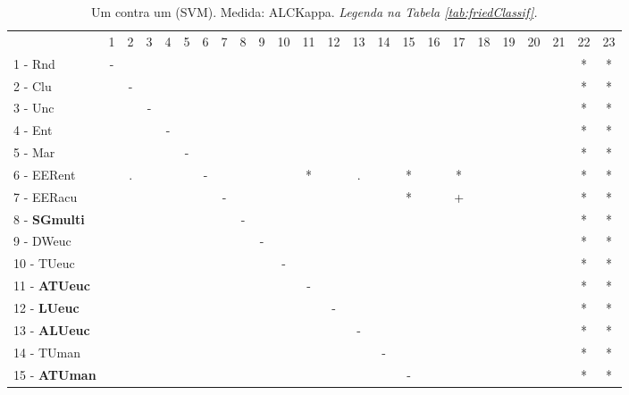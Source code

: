 \begin{table}[h]
\caption{Um contra um (SVM). Medida: ALCKappa. \textit{Legenda na Tabela \ref{tab:friedClassif}.}}
\begin{center}\begin{tabular}{lcc|cc|cc|cc|cc|cc|cc|cc|cc|cc|cc|c}
 			& 1 & 2 & 3 & 4 & 5 & 6 & 7 & 8 & 9 & 10 & 11 & 12 & 13 & 14 & 15 & 16 & 17 & 18 & 19 & 20 & 21 & 22 & 23\\
1 - Rnd  	& - &   &   &   &   &   &   &   &   &   &   &   &   &   &   &   &   &   &   &   &   & * & * \\
2 - Clu  	&   & - &   &   &   &   &   &   &   &   &   &   &   &   &   &   &   &   &   &   &   & * & * \\ \hline
3 - Unc  	&   &   & - &   &   &   &   &   &   &   &   &   &   &   &   &   &   &   &   &   &   & * & * \\
4 - Ent  	&   &   &   & - &   &   &   &   &   &   &   &   &   &   &   &   &   &   &   &   &   & * & * \\ \hline
5 - Mar  	&   &   &   &   & - &   &   &   &   &   &   &   &   &   &   &   &   &   &   &   &   & * & * \\
6 - EERent	&   & . &   &   &   & - &   &   &   &   & * &   & . &   & * &   & * &   &   &   &   & * & * \\ \hline
7 - EERacu	&   &   &   &   &   &   & - &   &   &   &   &   &   &   & * &   & + &   &   &   &   & * & * \\
8 - \textbf{SGmulti}	&   &   &   &   &   &   &   & - &   &   &   &   &   &   &   &   &   &   &   &   &   & * & * \\ \hline
9 - DWeuc	&   &   &   &   &   &   &   &   & - &   &   &   &   &   &   &   &   &   &   &   &   & * & * \\
10 - TUeuc	&   &   &   &   &   &   &   &   &   & - &   &   &   &   &   &   &   &   &   &   &   & * & * \\ \hline
11 - \textbf{ATUeuc}	&   &   &   &   &   &   &   &   &   &   & - &   &   &   &   &   &   &   &   &   &   & * & * \\
12 - \textbf{LUeuc}	&   &   &   &   &   &   &   &   &   &   &   & - &   &   &   &   &   &   &   &   &   & * & * \\ \hline
13 - \textbf{ALUeuc}	&   &   &   &   &   &   &   &   &   &   &   &   & - &   &   &   &   &   &   &   &   & * & * \\
14 - TUman	&   &   &   &   &   &   &   &   &   &   &   &   &   & - &   &   &   &   &   &   &   & * & * \\ \hline
15 - \textbf{ATUman}	&   &   &   &   &   &   &   &   &   &   &   &   &   &   & - &   &   &   &   &   &   & * & * \\

\end{tabular}
\end{center}
\end{table}
